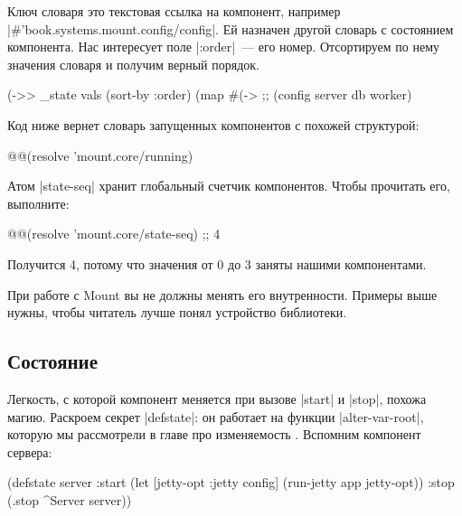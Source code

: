 Ключ словаря это текстовая ссылка на компонент, например
\spverb|#'book.systems.mount.config/config|. Ей назначен другой словарь с
состоянием компонента. Нас интересует поле \spverb|:order|~--- его
номер. Отсортируем по нему значения словаря и получим верный порядок.

\begin{english}
  \begin{clojure}
(->> _state
     vals
     (sort-by :order)
     (map #(-> %
;; (config server db worker)
  \end{clojure}
\end{english}

Код ниже вернет словарь запущенных компонентов с похожей структурой:

\begin{english}
  \begin{clojure}
@@(resolve 'mount.core/running)
  \end{clojure}
\end{english}

Атом \spverb|state-seq| хранит глобальный счетчик компонентов. Чтобы прочитать
его, выполните:

\begin{english}
  \begin{clojure}
@@(resolve 'mount.core/state-seq) ;; 4
  \end{clojure}
\end{english}

\noindent
Получится 4, потому что значения от 0 до 3 заняты нашими компонентами.

При работе с Mount вы не должны менять его внутренности. Примеры выше нужны,
чтобы читатель лучше понял устройство библиотеки.

\subsection{Состояние}

Легкость, с которой компонент меняется при вызове \spverb|start| и
\spverb|stop|, похожа магию. Раскроем секрет \spverb|defstate|: он работает на
функции \spverb|alter-var-root|, которую мы рассмотрели в главе про
изменяемость . Вспомним компонент сервера:

\begin{english}
  \begin{clojure}
(defstate server
  :start (let [{jetty-opt :jetty} config]
           (run-jetty app jetty-opt))
  :stop (.stop ^Server server))
  \end{clojure}
\end{english}

